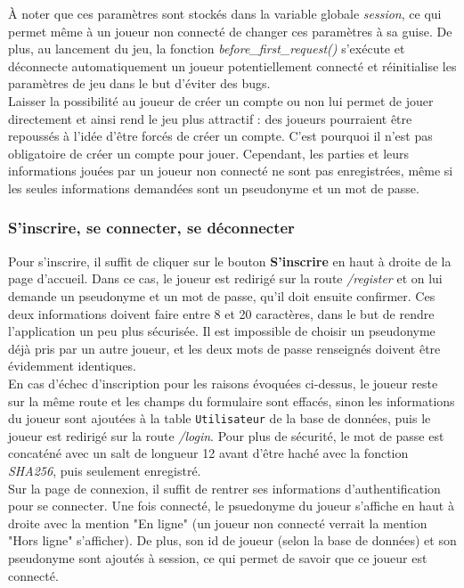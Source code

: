 \tabto{1cm}À noter que ces paramètres sont stockés dans la variable globale \emph{session}, ce qui permet même à un joueur non connecté de changer ces paramètres à sa guise. De plus, au lancement du jeu, la fonction \emph{before\_first\_request()} s'exécute et déconnecte automatiquement un joueur potentiellement connecté et réinitialise les paramètres de jeu dans le but d'éviter des bugs.\\

\tabto{1cm}Laisser la possibilité au joueur de créer un compte ou non lui permet de jouer directement et ainsi rend le jeu plus attractif : des joueurs pourraient être repoussés à l'idée d'être forcés de créer un compte. C'est pourquoi il n'est pas obligatoire de créer un compte pour jouer. Cependant, les parties et leurs informations jouées par un joueur non connecté ne sont pas enregistrées, même si les seules informations demandées sont un pseudonyme et un mot de passe.

\subsubsection*{S'inscrire, se connecter, se déconnecter}

\tabto{1cm}Pour s'inscrire, il suffit de cliquer sur le bouton \textbf{S'inscrire} en haut à droite de la page d'accueil. Dans ce cas, le joueur est redirigé sur la route \emph{/register} et on lui demande un pseudonyme et un mot de passe, qu'il doit ensuite confirmer. Ces deux informations doivent faire entre 8 et 20 caractères, dans le but de rendre l'application un peu plus sécurisée. Il est impossible de choisir un pseudonyme déjà pris par un autre joueur, et les deux mots de passe renseignés doivent être évidemment identiques. \\

\tabto{1cm}En cas d'échec d'inscription pour les raisons évoquées ci-dessus, le joueur reste sur la même route et les champs du formulaire sont effacés, sinon les informations du joueur sont ajoutées à la table \texttt{Utilisateur} de la base de données, puis le joueur est redirigé sur la route \emph{/login}. Pour plus de sécurité, le mot de passe est concaténé avec un salt de longueur 12 avant d'être haché avec la fonction \emph{SHA256}, puis seulement enregistré.\\

\tabto{1cm}Sur la page de connexion, il suffit de rentrer ses informations d'authentification pour se connecter. Une fois connecté, le psuedonyme du joueur s'affiche en haut à droite avec la mention "En ligne" (un joueur non connecté verrait la mention "Hors ligne" s'afficher). De plus, son id de joueur (selon la base de données) et son pseudonyme sont ajoutés à session, ce qui permet de savoir que ce joueur est connecté.\\

